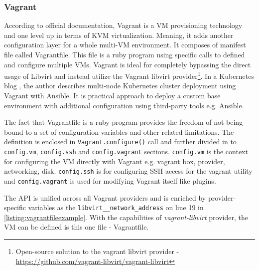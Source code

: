 \subsubsection*{Vagrant \label{anal:virtual:kvm:vagrant}}
According to official documentation\cite{docs:vagrant}, Vagrant is a VM provisioning technology and one level up in terms of KVM virtualization. Meaning, it adds another configuration layer for a whole multi-VM environment. It composes of manifest file called Vagrantfile. This file is a ruby program using specific calls to defined and configure multiple VMs. Vagrant is ideal for completely bypassing the direct usage of Libvirt and instead utilize the Vagrant libvirt provider\footnote{Open-source solution to the vagrant libvirt provider - \url{https://github.com/vagrant-libvirt/vagrant-libvirt}}. In a Kubernetes blog \cite{blog:k8s:vagrant}, the author describes multi-node Kubernetes cluster deployment using Vagrant with Ansible. It is practical approach to deploy a custom base environment with additional configuration using third-party tools e.g. Ansible.




The fact that Vagrantfile is a ruby program provides the freedom of not being bound to a set of configuration variables and other related limitations. The definition is enclosed in \texttt{Vagrant.configure()} call and further divided in to \texttt{config.vm}, \texttt{config.ssh} and \texttt{config.vagrant} sections. \texttt{config.vm} is the context for configuring the VM directly with Vagrant e.g. vagrant box, provider, networking, disk. \texttt{config.ssh} is for configuring SSH access for the vagrant utility and \texttt{config.vagrant} is used for modifying Vagrant itself like plugins.

The API is unified across all Vagrant providers and is enriched by provider-specific variables as the \texttt{libvirt\_\_network\_address} on line 19 in \autoref{listing:vagrantfileexample}. With the capabilities of \textit{vagrant-libvirt} provider, the VM can be defined is this one file - Vagrantfile.

